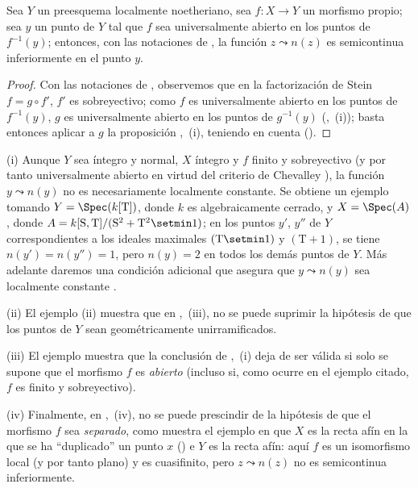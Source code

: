 \begin{corollary}[15.5.4]
\label{IV.15.5.4}
Sea $Y$ un preesquema localmente noetheriano, sea $f:X\to Y$ un morfismo propio; sea $y$ un punto de $Y$ tal que $f$ sea universalmente abierto en los puntos de $f^{-1}(y)$;
entonces, con las notaciones de , la función $z\leadsto n(z)$ es semicontinua inferiormente en el punto $y$.
\end{corollary}

\begin{proof}
Con las notaciones de , observemos que en la factorización de Stein $f=g\circ f'$, $f'$ es sobreyectivo; como $f$ es universalmente abierto en los puntos de $f^{-1}(y)$, $g$ es universalmente abierto en los puntos de $g^{-1}(y)$ (,~(i)); basta entonces aplicar a $g$ la proposición ,~(i), teniendo en cuenta ().
\end{proof}

\begin{remarks}[15.5.5]
\label{IV.15.5.5}
(i)
Aunque $Y$ sea íntegro y normal, $X$ íntegro y $f$ finito y sobreyectivo (y por tanto universalmente abierto en virtud del criterio de Chevalley ), la función $y\leadsto n(y)$ no es necesariamente localmente constante.
Se obtiene un ejemplo tomando $Y=\Spec(k[\mathrm{T}])$, donde $k$ es algebraicamente cerrado, y $X=\Spec(A)$, donde $A=k[\mathrm{S},\mathrm{T}]/(\mathrm{S}^2+\mathrm{T}^2\setmin 1)$; en los puntos $y'$, $y''$ de $Y$ correspondientes a los ideales maximales $(\mathrm{T}\setmin 1)$ y $(\mathrm{T}+1)$, se tiene $n(y')=n(y'')=1$, pero $n(y)=2$ en todos los demás puntos de $Y$.
Más adelante daremos una condición adicional que asegura que $y\leadsto n(y)$ sea localmente constante .

(ii)
El ejemplo  (ii) muestra que en ,~(iii), no se puede suprimir la hipótesis de que los puntos de $Y$ sean geométricamente unirramificados.

(iii)
El ejemplo  muestra que la conclusión de ,~(i) deja de ser válida si solo se supone que el morfismo $f$ es \emph{abierto} (incluso si, como ocurre en el ejemplo citado, $f$ es finito y sobreyectivo).

(iv)
Finalmente, en ,~(iv), no se puede prescindir de la hipótesis de que el morfismo $f$ sea \emph{separado}, como muestra el ejemplo en que $X$ es la recta afín en la que se ha ``duplicado'' un punto $x$ () e $Y$ es la recta afín: aquí $f$ es un isomorfismo local (y por tanto plano) y es cuasifinito, pero $z\leadsto n(z)$ no es semicontinua inferiormente.
\end{remarks}


